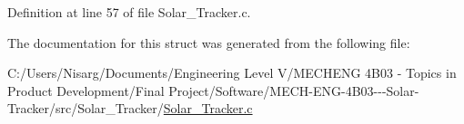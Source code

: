 Definition at line 57 of file Solar\+\_\+\+Tracker.\+c.



The documentation for this struct was generated from the following file\+:\begin{DoxyCompactItemize}
\item 
C\+:/\+Users/\+Nisarg/\+Documents/\+Engineering Level V/\+M\+E\+C\+H\+E\+N\+G 4\+B03 -\/ Topics in Product Development/\+Final Project/\+Software/\+M\+E\+C\+H-\/\+E\+N\+G-\/4\+B03-\/-\/-\/\+Solar-\/\+Tracker/src/\+Solar\+\_\+\+Tracker/\hyperlink{_solar___tracker_8c}{Solar\+\_\+\+Tracker.\+c}\end{DoxyCompactItemize}
